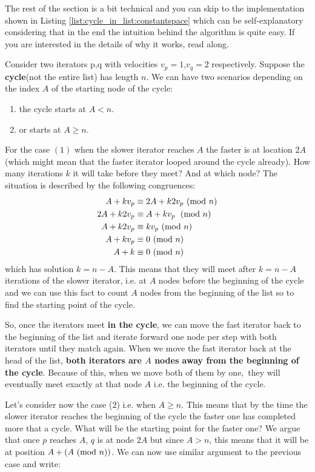 The rest of the section is a bit technical and you can skip to
the implementation shown in Listing \ref{list:cycle_in_list:constantspace} which can be self-explanatory considering that in the end the intuition behind the algorithm is quite easy. If you
are interested in the details of why it works, read along. 


Consider two iterators p,q with velocities $v_p=1$,$v_q=2$  respectively. Suppose the
\textbf{cycle}(not the entire list) has length $n$. We can have two scenarios depending on the index
$A$ of the starting node of the cycle:

\begin{enumerate}
\item the cycle starts at $A < n$.
\item or  starts at \(A \geq n\).
\end{enumerate}
For the case $(1)$ when the slower iterator reaches $A$ the faster is at location $2A$ (which might
mean that the faster iterator looped around the cycle already). How many iterations $k$ it will take
before they meet? And at which node?
The situation is described by the following congruences:
\begin{align}
  A + kv_p &\equiv 2A + k2v_p \ (\mathrm{mod}\ n) \\
  2A + k2v_p &\equiv A + kv_p \;  \ (\mathrm{mod}\ n) \\
  A + k2v_p &\equiv kv_p   \ (\mathrm{mod}\ n) \\
  A +kv_p &\equiv 0   \ (\mathrm{mod}\ n) \\
  A +k &\equiv 0  \ (\mathrm{mod}\ n)
\end{align}
which has solution \(k = n-A\). This means that they will meet after \(k=n-A\) iterations of the
slower iterator, i.e. at \(A\) nodes before the beginning of the cycle and we can use this fact to
count \(A\) nodes from the beginning of the list so to find the starting point of the cycle. 

So, once the iterators meet \textbf{in the cycle}, we can move the fast iterator back to the
beginning of the list and iterate forward one node per step with both iterators until they match
again. When we move the fast iterator back at the head of the list, \textbf{both iterators are \(A\)
nodes away from the beginning of the cycle}. Because of this, when we move both of them by one, they
will eventually meet exactly at that node \(A\) i.e. the beginning of the cycle.


Let's consider now the case ($2$) i.e.  when \(A \geq n\). This means that by the time the slower
iterator reaches the beginning of the cycle the faster one has completed more that a cycle. What
will be the starting point for the faster one? We argue that once \(p\) reaches \(A\), \(q\) is at
node \(2A\) but since \(A > n\), this means that it will be at position \(A + (A \ (\mathrm{mod}\ n))\). We can
now use similar argument to the previous case and write:

